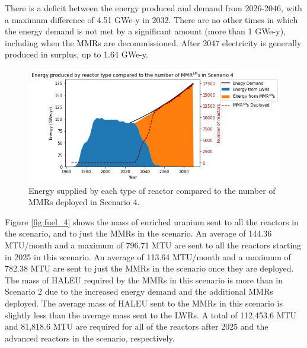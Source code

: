 There is a deficit between the energy produced and  
demand from 2026-2046, with a maximum difference of 4.51 GWe-y in 2032.
There are no other times in which the energy demand is not met by a 
significant amount (more than 1 GWe-y), including when the \glspl{MMR} are 
decommissioned. After 2047 electricity is generally produced in surplus, 
up to 1.64 GWe-y. 

\begin{figure}
    \centering 
    \includegraphics[width=\textwidth]{../figures/energy_scenario4.png}
    \caption{Energy supplied by each type of reactor compared to the number of 
    \glspl{MMR} deployed in Scenario 4.}
    \label{fig:energy_rx_4}
\end{figure}

Figure \ref{fig:fuel_4} shows the mass of enriched uranium sent to all the 
reactors in the scenario, and to just the \glspl{MMR} 
in the scenario. An average of 144.36 MTU/month and a maximum of 796.71 MTU
are sent to all the reactors starting in 2025 in this scenario. An average of 
113.64 MTU/month and a maximum of 782.38 MTU are sent to just the \glspl{MMR}
in the scenario once they are deployed. The mass of \gls{HALEU}
required by the \glspl{MMR} in this scenario is more than  
in Scenario 2 due to the increased energy 
demand and the additional \glspl{MMR} deployed. The 
average mass of \gls{HALEU} sent to the \glspl{MMR} in this scenario is 
slightly less than the average mass sent to the \glspl{LWR}. 
A total of 112,453.6 MTU and 81,818.6 MTU are required for all of the 
reactors after 2025 and the advanced reactors in the scenario, respectively. 

